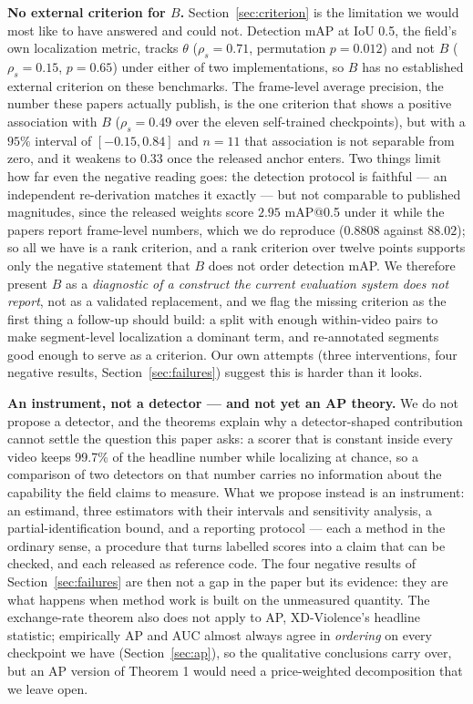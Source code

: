 \documentclass[number,preprint,12pt]{elsarticle}
\begin{document}
\textbf{No external criterion for \(B\).} Section~\ref{sec:criterion} is the limitation
we would most like to have answered and could not. Detection mAP at IoU 0.5,
the field's own localization metric, tracks \(\theta\) (\(\rho_s=0.71\),
permutation \(p=0.012\)) and not \(B\) (\(\rho_s=0.15\), \(p=0.65\)) under either of two
implementations, so \(B\) has no established external criterion on these
benchmarks. The frame-level average precision, the number these papers actually
publish, is the one criterion that shows a positive association with \(B\)
(\(\rho_s=0.49\) over the eleven self-trained checkpoints), but with a \(95\%\)
interval of \([-0.15,0.84]\) and \(n=11\) that association is not separable from
zero, and it weakens to \(0.33\) once the released anchor enters. Two things limit
how far even the negative reading goes: the detection protocol is faithful ---
an independent re-derivation matches it exactly --- but not comparable to
published magnitudes, since the released weights score \(2.95\) mAP@0.5 under it
while the papers report frame-level numbers, which we do reproduce (\(0.8808\)
against \(88.02\)); so all we have is a rank criterion, and a rank criterion over
twelve points supports only the negative statement that \(B\) does not order
detection mAP. We therefore present \(B\) as a \emph{diagnostic of a construct the
current evaluation system does not report}, not as a validated replacement, and
we flag the missing criterion as the first thing a follow-up should build: a
split with enough within-video pairs to make segment-level localization a
dominant term, and re-annotated segments good enough to serve as a criterion.
Our own attempts (three interventions, four negative results,
Section~\ref{sec:failures}) suggest this is harder than it looks.

\textbf{An instrument, not a detector --- and not yet an AP theory.} We do not
propose a detector, and the theorems explain why a detector-shaped contribution
cannot settle the question this paper asks: a scorer that is constant inside
every video keeps 99.7\% of the headline number while localizing at chance, so a
comparison of two detectors on that number carries no information about the
capability the field claims to measure. What we propose instead is an
instrument: an estimand, three estimators with their intervals and sensitivity
analysis, a partial-identification bound, and a reporting protocol --- each a
method in the ordinary sense, a procedure that turns labelled scores into a
claim that can be checked, and each released as reference code. The four
negative results of Section~\ref{sec:failures} are then not a gap in the paper
but its evidence: they are what happens when method work is built on the
unmeasured quantity. The exchange-rate theorem also does not apply to AP,
XD-Violence's headline statistic; empirically AP and AUC almost always agree in
\emph{ordering} on every checkpoint we have (Section~\ref{sec:ap}), so the
qualitative conclusions carry over, but an AP version of Theorem 1 would need a
price-weighted decomposition that we leave open.
\end{document}
